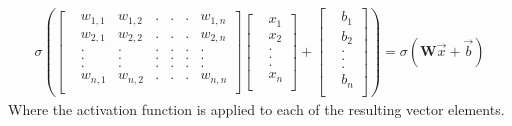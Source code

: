 \documentclass{article}
\begin{document}
\begin{align*}
\sigma \left(\begin{bmatrix}
&w_{1,1} &w_{1,2} &.&.&. &w_{1,n} \\
&w_{2,1} &w_{2,2} &.&.&. &w_{2,n}  \\
&.&.&.&.&.&. \\
&. &.&.&.&.&.\\
&. &.&.&.&.&.\\
&w_{n,1} &w_{n,2} &.&.&. &w_{n,n}  \\
\end{bmatrix} 
\begin{bmatrix}
&x_1 \\
&x_2 \\
&. \\
&. \\
&. \\
&x_n \\
\end{bmatrix}
+
\begin{bmatrix}
&b_1 \\
&b_2 \\
&. \\
&. \\
&. \\
&b_n \\
\end{bmatrix}
\right) = \sigma \left(\textbf{W} \vec{x} + \vec{b}\right)
\end{align*}
Where the activation function is applied to each of the resulting vector elements. 
\end{document}
